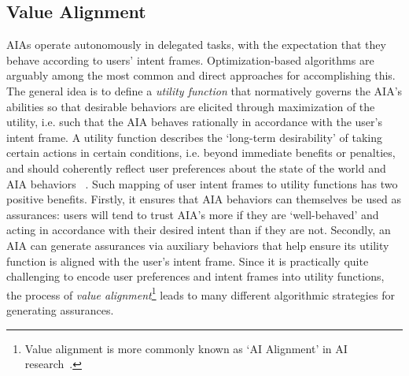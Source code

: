 \subsection{Value Alignment} \label{sec:value_alignment}
AIAs operate autonomously in delegated tasks, with the expectation that they behave according to users' intent frames. 
Optimization-based algorithms are arguably among the most common and direct approaches for accomplishing this. 
The general idea is to define a \emph{utility function} that normatively governs the AIA's abilities so that desirable behaviors are elicited through maximization of the utility, i.e. such that the AIA behaves rationally in accordance with the user's intent frame. 
A utility function describes the `long-term desirability' of taking certain actions in certain conditions, i.e. beyond immediate benefits or penalties, and should coherently reflect user preferences about the state of the world and AIA behaviors ~\cite{Russell2010-wv}. 
Such mapping of user intent frames to utility functions has two positive benefits. 
Firstly, it ensures that AIA behaviors can themselves be used as assurances: users will tend to trust AIA's more if they are `well-behaved' and acting in accordance with their desired intent than if they are not. 
Secondly, an AIA can generate assurances via auxiliary behaviors that help ensure its utility function is aligned with the user's intent frame.  Since it is practically quite challenging to encode user preferences and intent frames into utility functions, the process of \emph{value alignment}\footnote{Value alignment is more commonly known as `AI Alignment' in AI research~\cite{Yudkowsky2001-hb,Bensinger2014-ul}.} leads to many different algorithmic strategies for generating assurances. 

